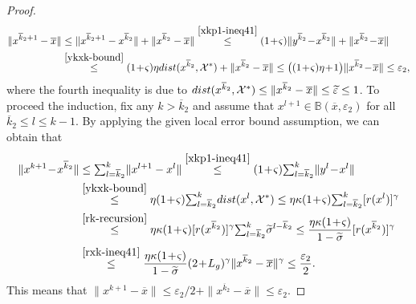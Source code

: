 \documentclass[10pt,a4paper]{amsart}
\begin{document}
\begin{proof}
  \begin{align*}
  \|x^{\overline{k}_2+1}-\overline{x}\|
  &\le\|x^{\overline{k}_2+1}-x^{\overline{k}_2}\|+\|x^{\overline{k}_2}-\overline{x}\|\stackrel{\eqref{xkp1-ineq41}}{\le} (1\!+\!\varsigma)\|y^{\overline{k}_2}\!-\!x^{\overline{k}_2}\|+\|x^{\overline{k}_2}\!-\!\overline{x}\|\\
  &\stackrel{\eqref{ykxk-bound}}{\le} (1\!+\!\varsigma)\eta{\rm dist}(x^{\overline{k}_2},\mathcal{X}^*)+\|x^{\overline{k}_2}-\overline{x}\|\le\big((1\!+\!\varsigma)\eta\!+\!1\big)\|x^{\overline{k}_2}\!-\!\overline{x}\|\le\varepsilon_2,  
 \end{align*}
 where the fourth inequality is due to ${\rm dist}(x^{\overline{k}_2},\mathcal{X}^*)\le\|x^{\overline{k}_2}-\overline{x}\|\le\widetilde{\varepsilon}\le1$. To proceed the induction, fix any $k>\overline{k}_2$ and assume that $x^{l+1}\in\mathbb{B}(\overline{x},\varepsilon_2)$ for all $\overline{k}_2\le l\le k\!-\!1$. By applying the given local error bound assumption, we can obtain that  
 \begin{align*}
  \|x^{k+1}\!-\!x^{\overline{k}_2}\|
  &\le{\textstyle\sum_{l=\overline{k}_2}^{k}}\|x^{l+1}-x^l\|
  \stackrel{\eqref{xkp1-ineq41}}{\le} (1\!+\!\varsigma){\textstyle\sum_{l=\overline{k}_2}^{k}}\|y^l\!-\!x^l\|\\
  &\stackrel{\eqref{ykxk-bound}}{\le} \eta(1\!+\!\varsigma){\textstyle\sum_{l=\overline{k}_2}^{k}}{\rm dist}(x^l,\mathcal{X}^*)
  \le \eta\kappa(1\!+\!\varsigma){\textstyle\sum_{l=\overline{k}_2}^{k}}[r(x^l)]^{\gamma}\\ 
  &\stackrel{\eqref{rk-recursion}}{\le} \eta\kappa(1\!+\!\varsigma)[r(x^{\overline{k}_2})]^{\gamma}{\textstyle\sum_{l=\overline{k}_2}^{k}}\widetilde{\sigma}^{l-\overline{k}_2}
  \le\frac{\eta\kappa(1\!+\!\varsigma)}{1-\widetilde{\sigma}}[r(x^{\overline{k}_2})]^{\gamma}\\
  &\stackrel{\eqref{rxk-ineq41}}{\le}\frac{\eta\kappa(1\!+\!\varsigma)}{1-\widetilde{\sigma}}(2\!+\!L_g)^{\gamma}\|x^{\overline{k}_2}-\overline{x}\|^{\gamma}\le\frac{\varepsilon_2}{2}.
  \end{align*}
  This means that $\|x^{k+1}-\overline{x}\|\le \varepsilon_2/2+\|x^{\overline{k}_2}-\overline{x}\|\le\varepsilon_2$. 
   

\end{proof}
\end{document}
